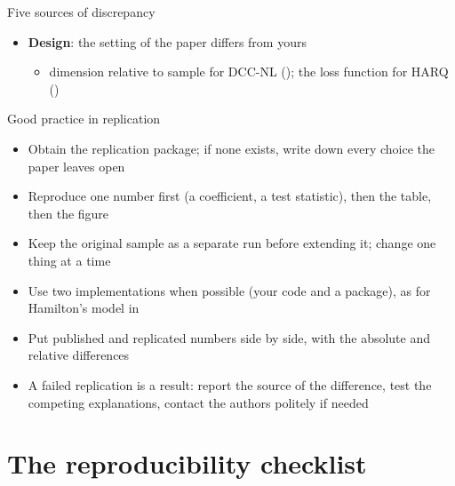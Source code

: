 \begin{frame}{Five sources of discrepancy}
\begin{itemize}
\begin{itemize}
    \end{itemize}
    \item \textbf{Design}: the setting of the paper differs from yours
    \begin{itemize}
        \item dimension relative to sample for DCC-NL (); the loss function for HARQ ()
    \end{itemize}
\end{itemize}
\end{frame}

\begin{frame}{Good practice in replication}
\itemsize{\small}
\begin{itemize}
    \item Obtain the replication package; if none exists, write down every choice the paper leaves open
    \item Reproduce one number first (a coefficient, a test statistic), then the table, then the figure
    \item Keep the original sample as a separate run before extending it; change one thing at a time
    \item Use two implementations when possible (your code and a package), as for Hamilton's model in 
    \item Put published and replicated numbers side by side, with the absolute and relative differences
    \item A failed replication is a result: report the source of the difference, test the competing explanations, contact the authors politely if needed
\end{itemize}
\end{frame}


\section{The reproducibility checklist}

